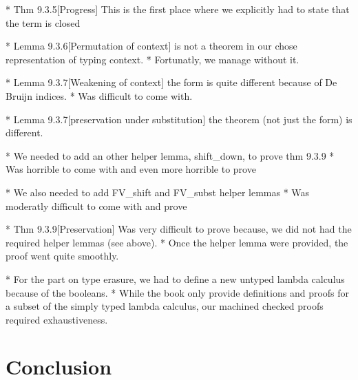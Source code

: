 \documentclass[a4paper, oneside, 12pt, titlepage]{article}
\begin{document}
  * Thm 9.3.5[Progress] This is the first place where we explicitly had to state that the term is
    closed

  * Lemma 9.3.6[Permutation of context] is not a theorem in our chose representation of typing
    context.
    * Fortunatly, we manage without it.

  * Lemma 9.3.7[Weakening of context] the form is quite different because of De Bruijn indices.
    * Was difficult to come with.

  * Lemma 9.3.7[preservation under substitution] the theorem (not just the form) is different.

  * We needed to add an other helper lemma, shift\_down, to prove thm 9.3.9
    * Was horrible to come with and even more horrible to prove

  * We also needed to add FV\_shift and FV\_subst helper lemmas
    * Was moderatly difficult to come with and prove

  * Thm 9.3.9[Preservation] Was very difficult to prove because, we did not had the required helper
    lemmas (see above).
    * Once the helper lemma were provided, the proof went quite smoothly.

  * For the part on type erasure, we had to define a new untyped lambda calculus because of the
    booleans.
    * While the book only provide definitions and proofs for a subset of the simply typed lambda
      calculus, our machined checked proofs required exhaustiveness.

\section{Conclusion}
\end{document}
